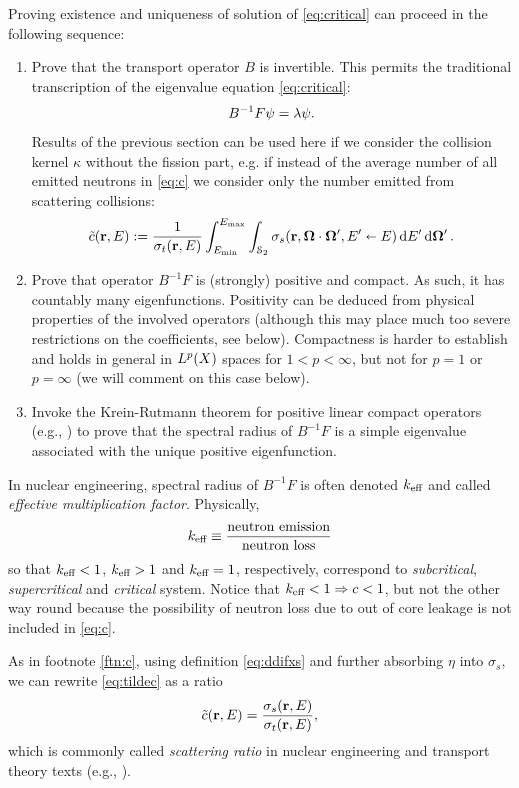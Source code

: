 Proving existence and uniqueness of solution of \eqref{eq:critical} can proceed in the following sequence:
\begin{enumerate}
	\item
		Prove that the transport operator $B$ is invertible. This permits the traditional transcription of the  eigenvalue
		equation \eqref{eq:critical}:
		$$
		B^{-1}F\psi = \lambda\psi.
		$$
		Results of the previous section can be used here if we consider the collision kernel $\kappa$ without the fission
		part, e.g. if instead of the average number of all emitted neutrons in \eqref{eq:c} we consider only the number
		emitted from scattering collisions: 
		\begin{equation}\label{eq:tildec}
		\tilde c(\mathbf{r},E) := \frac{1}{\sigma_t(\mathbf{r},E)}\int_{E_{\text{min}}}^{E_{\text{max}}}\int_{\mathcal{S}_2}
		\sigma_s(\mathbf{r},\mathbf{\Omega}\cdot\mathbf{\Omega}', E'\shortleftarrow E)\,\text{d}E'\,\text{d}\mathbf{\Omega}'\,.
	    \end{equation}
	\item
		Prove that operator $B^{-1}F$ is (strongly) positive and compact. As such, it has countably many eigenfunctions. 
		Positivity can be deduced from physical properties of the involved operators (although this may place much too severe
		restrictions on the coefficients, see below). Compactness is harder to establish and holds in general in $L^{p}(X)$
		spaces for $1 < p < \infty$, but not for $p = 1$ or $p = \infty$ (we will comment on this case below).
	\item
		Invoke the Krein-Rutmann theorem for positive linear compact operators (e.g., \cite[Thm. 5.4.33]{DrabekNFA}) to prove
		that the spectral radius of $B^{-1}F$ is a simple eigenvalue associated with the unique positive eigenfunction.
\end{enumerate}
\begin{remark}\label{rem:keff}
In nuclear engineering, spectral radius of $B^{-1}F$ is often denoted $k_{\text{eff}}$
and called \textit{effective multiplication factor}. Physically,
$$
k_{\text{eff}} \equiv \frac{\mbox{neutron emission}}{\mbox{neutron loss}}
$$
so that 
$k_{\text{eff}} < 1$, $k_{\text{eff}} > 1$ and $k_{\text{eff}} = 1$, respectively, correspond to \textit{subcritical},
\textit{supercritical} and \textit{critical} system. Notice that $k_{\text{eff}} < 1 \Rightarrow c < 1$, but not the other way
round because the possibility of neutron loss due to out of core leakage is not included in \eqref{eq:c}. 
\end{remark}
\begin{remark}
As in footnote \ref{ftn:c}, using definition \eqref{eq:ddifxs} and further absorbing $\eta$ into
$\sigma_s$, we can rewrite \eqref{eq:tildec} as a ratio 
\begin{equation}\label{eq:scattering_ratio}
\tilde{c}(\mathbf{r},E) = \frac{\sigma_s(\mathbf{r},E)}{\sigma_t(\mathbf{r},E)},
\end{equation}
which is commonly called \textit{scattering ratio} in nuclear engineering and transport theory texts (e.g.,
\cite{Adams}).
\end{remark}

